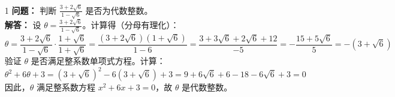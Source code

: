 \documentclass[UTF8]{ctexart}
\begin{document}
\begin{enumerate}

\item[1] 
\textbf{问题：} 判断 \(\frac{3 + 2 \sqrt{6}}{1 - \sqrt{6}}\) 是否为代数整数。\\
\textbf{解答：} 设 \(\theta = \frac{3 + 2 \sqrt{6}}{1 - \sqrt{6}}\)。计算得（分母有理化）：
\[
\theta = \frac{3 + 2 \sqrt{6}}{1 - \sqrt{6}} \cdot \frac{1 + \sqrt{6}}{1 + \sqrt{6}} = \frac{(3 + 2 \sqrt{6})(1 + \sqrt{6})}{1 - 6} = \frac{3 + 3 \sqrt{6} + 2 \sqrt{6} + 12}{-5} = -\frac{15 + 5 \sqrt{6}}{5} = -(3 + \sqrt{6})
\]
验证 \(\theta\) 是否满足整系数单项式方程。计算：
\[
\theta^2 + 6\theta + 3 = (3 + \sqrt{6})^2 - 6(3 + \sqrt{6}) + 3 = 9 + 6 \sqrt{6} + 6 - 18 - 6 \sqrt{6} + 3 = 0
\]
因此，\(\theta\) 满足整系数方程 \(x^2 + 6x + 3 = 0\)，故 \(\theta\) 是代数整数。








\end{enumerate}
\end{document}

